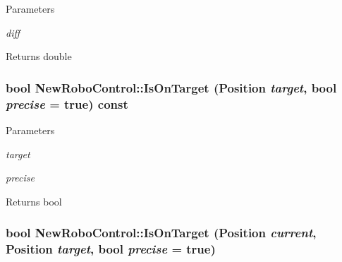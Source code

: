 \begin{DoxyParams}{Parameters}
\item[{\em diff}]\end{DoxyParams}
\begin{DoxyReturn}{Returns}
double 
\end{DoxyReturn}
\hypertarget{classNewRoboControl_a77b0e86bef15f3b1fb6cf98d91c6a9b4}{
\subsubsection[{IsOnTarget}]{\setlength{\rightskip}{0pt plus 5cm}bool NewRoboControl::IsOnTarget (Position {\em target}, \/  bool {\em precise} = {\ttfamily true}) const}}
\label{classNewRoboControl_a77b0e86bef15f3b1fb6cf98d91c6a9b4}

\begin{DoxyParams}{Parameters}
\item[{\em target}]\item[{\em precise}]\end{DoxyParams}
\begin{DoxyReturn}{Returns}
bool 
\end{DoxyReturn}
\hypertarget{classNewRoboControl_a106c7ccc03f05693a07da1235ab0b17f}{
\subsubsection[{IsOnTarget}]{\setlength{\rightskip}{0pt plus 5cm}bool NewRoboControl::IsOnTarget (Position {\em current}, \/  Position {\em target}, \/  bool {\em precise} = {\ttfamily true})}}
\label{classNewRoboControl_a106c7ccc03f05693a07da1235ab0b17f}

